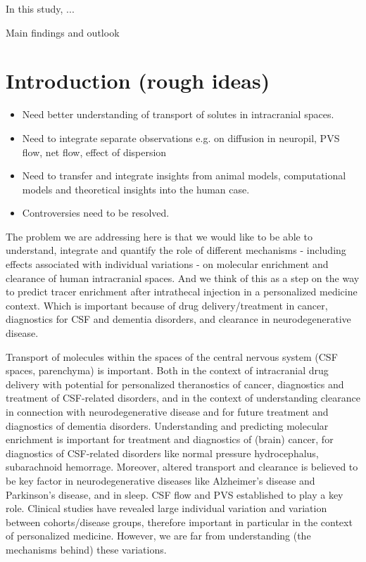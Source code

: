 \documentclass[fleqn,10pt]{wlscirep}
\begin{document}
In this study, ... \textcolor{lightgray}{\lipsum[1]}

Main findings and outlook \textcolor{lightgray}{\lipsum[1]}

\newpage
\section*{Introduction (rough ideas)}

\begin{itemize}
\item
  Need better understanding of transport of solutes in intracranial spaces.
\item
  Need to integrate separate observations e.g. on diffusion in
  neuropil, PVS flow, net flow, effect of dispersion
\item
 Need to transfer and integrate insights from animal models,
  computational models and theoretical insights into the human case. 
\item
 Controversies need to be resolved.
\end{itemize}

The problem we are addressing here is that we would like to be able to
understand, integrate and quantify the role of different mechanisms -
including effects associated with individual variations - on molecular
enrichment and clearance of human intracranial spaces. And we think of
this as a step on the way to predict tracer enrichment after
intrathecal injection in a personalized medicine context. Which is
important because of drug delivery/treatment in cancer, diagnostics
for CSF and dementia disorders, and clearance in neurodegenerative
disease.

Transport of molecules within the spaces of the central nervous system
(CSF spaces, parenchyma) is important. Both in the context of
intracranial drug delivery with potential for personalized theranostics
of cancer, diagnostics and treatment of CSF-related disorders, and in
the context of understanding clearance in connection with
neurodegenerative disease and for future treatment and diagnostics of
dementia disorders. Understanding and predicting molecular enrichment
is important for treatment and diagnostics of (brain) cancer, for
diagnostics of CSF-related disorders like normal pressure
hydrocephalus, subarachnoid hemorrage. Moreover, altered transport and
clearance is believed to be key factor in neurodegenerative diseases
like Alzheimer's disease and Parkinson's disease, and in sleep. CSF
flow and PVS established to play a key role. Clinical studies have
revealed large individual variation and variation between
cohorts/disease groups, therefore important in particular in the
context of personalized medicine. However, we are far from
understanding (the mechanisms behind) these variations.
\end{document}
